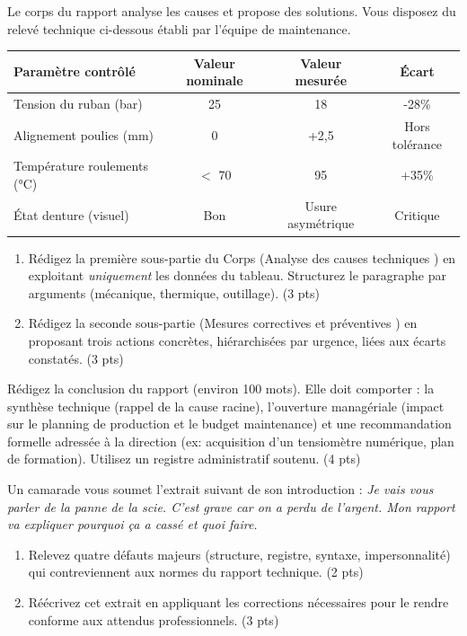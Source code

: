 \documentclass[11pt]{article}
\begin{document}
\begin{exercice}
Le corps du rapport analyse les causes et propose des solutions. Vous disposez du relevé technique ci-dessous établi par l'équipe de maintenance.

\begin{center}
\begin{tabular}{|l|c|c|c|}
\hline
\textbf{Paramètre contrôlé} & \textbf{Valeur nominale} & \textbf{Valeur mesurée} & \textbf{Écart} \\ \hline
Tension du ruban (bar) & 25 & 18 & -28\% \\ \hline
Alignement poulies (mm) & 0 & +2,5 & Hors tolérance \\ \hline
Température roulements (°C) & $<$ 70 & 95 & +35\% \\ \hline
État denture (visuel) & Bon & Usure asymétrique & Critique \\ \hline
\hline
\end{tabular}
\end{center}

\begin{enumerate}
    \item Rédigez la première sous-partie du Corps (\og Analyse des causes techniques \fg) en exploitant \textit{uniquement} les données du tableau. Structurez le paragraphe par arguments (mécanique, thermique, outillage). (3 pts)
    \item Rédigez la seconde sous-partie (\og Mesures correctives et préventives \fg) en proposant trois actions concrètes, hiérarchisées par urgence, liées aux écarts constatés. (3 pts)
\end{enumerate}
\end{exercice}

\begin{exercice}
Rédigez la conclusion du rapport (environ 100 mots). Elle doit comporter : la synthèse technique (rappel de la cause racine), l'ouverture managériale (impact sur le planning de production et le budget maintenance) et une recommandation formelle adressée à la direction (ex: acquisition d'un tensiomètre numérique, plan de formation). Utilisez un registre administratif soutenu. (4 pts)
\end{exercice}

\begin{exercice}
Un camarade vous soumet l'extrait suivant de son introduction : \og \textit{Je vais vous parler de la panne de la scie. C'est grave car on a perdu de l'argent. Mon rapport va expliquer pourquoi ça a cassé et quoi faire. \fg}
\begin{enumerate}
    \item Relevez quatre défauts majeurs (structure, registre, syntaxe, impersonnalité) qui contreviennent aux normes du rapport technique. (2 pts)
    \item Réécrivez cet extrait en appliquant les corrections nécessaires pour le rendre conforme aux attendus professionnels. (3 pts)
\end{enumerate}
\end{exercice}
\end{document}
